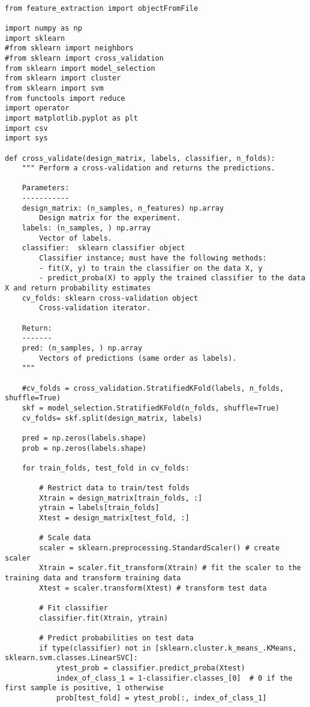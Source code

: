 \documentclass{article}
\begin{document}
\begin{lstlisting}

from feature_extraction import objectFromFile

import numpy as np
import sklearn
#from sklearn import neighbors
#from sklearn import cross_validation
from sklearn import model_selection
from sklearn import cluster
from sklearn import svm
from functools import reduce
import operator
import matplotlib.pyplot as plt
import csv
import sys

def cross_validate(design_matrix, labels, classifier, n_folds):
    """ Perform a cross-validation and returns the predictions.
    
    Parameters:
    -----------
    design_matrix: (n_samples, n_features) np.array
        Design matrix for the experiment.
    labels: (n_samples, ) np.array
        Vector of labels.
    classifier:  sklearn classifier object
        Classifier instance; must have the following methods:
        - fit(X, y) to train the classifier on the data X, y
        - predict_proba(X) to apply the trained classifier to the data X and return probability estimates 
    cv_folds: sklearn cross-validation object
        Cross-validation iterator.
        
    Return:
    -------
    pred: (n_samples, ) np.array
        Vectors of predictions (same order as labels).
    """
    
    #cv_folds = cross_validation.StratifiedKFold(labels, n_folds, shuffle=True)
    skf = model_selection.StratifiedKFold(n_folds, shuffle=True)
    cv_folds= skf.split(design_matrix, labels)
    
    pred = np.zeros(labels.shape)
    prob = np.zeros(labels.shape)

    for train_folds, test_fold in cv_folds:
        
        # Restrict data to train/test folds
        Xtrain = design_matrix[train_folds, :]
        ytrain = labels[train_folds]
        Xtest = design_matrix[test_fold, :]

        # Scale data
        scaler = sklearn.preprocessing.StandardScaler() # create scaler
        Xtrain = scaler.fit_transform(Xtrain) # fit the scaler to the training data and transform training data
        Xtest = scaler.transform(Xtest) # transform test data
        
        # Fit classifier
        classifier.fit(Xtrain, ytrain)

        # Predict probabilities on test data
        if type(classifier) not in [sklearn.cluster.k_means_.KMeans, sklearn.svm.classes.LinearSVC]:
            ytest_prob = classifier.predict_proba(Xtest)
            index_of_class_1 = 1-classifier.classes_[0]  # 0 if the first sample is positive, 1 otherwise
            prob[test_fold] = ytest_prob[:, index_of_class_1]
            

\end{lstlisting}
\end{document}
